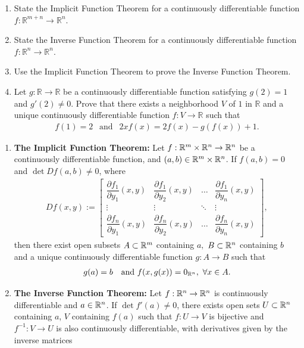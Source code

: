 \begin{problem}
\begin{enumerate}
    \item[(a)] State the Implicit Function Theorem for a continuously differentiable function $f:\mathbb{R}^{m+n} \rightarrow \mathbb{R}^{n}$.
    \item[(b)] State the Inverse Function Theorem for a continuously differentiable function $f:\mathbb{R}^n \rightarrow \mathbb{R}^n$.
    \item[(c)] Use the Implicit Function Theorem to prove the Inverse Function Theorem. 
    \item[(d)] Let $g:\mathbb{R}\rightarrow\mathbb{R}$ be a continuously differentiable function satisfying $g(2)=1$ and $g'(2)\neq 0$. Prove that there exists a neighborhood $V$ of $1$ in $\mathbb{R}$ and a unique continuously differentiable function $f:V\rightarrow \mathbb{R}$ such that 
    \begin{align*}
        f(1)=2\ \  \text{ and }\ \  2xf(x) = 2f(x) - g(f(x)) +1.
    \end{align*}
\end{enumerate}
\begin{solution}
\begin{enumerate}
    \item[(a)] \textbf{The Implicit Function Theorem:} Let $f: \mathbb{R}^{m}\times\mathbb{R}^n \to \mathbb{R}^n$ be a continuously differentiable function, and $(a,b)\in \mathbb{R}^m \times \mathbb{R}^n$. If $f(a,b) = 0$ and $\det Df(a,b) \ne 0$, where 
    \begin{align*}
        Df(x,y) := 
        \begin{bmatrix}
            \dfrac{\partial f_1}{\partial y_1}(x,y) & \dfrac{\partial f_1}{\partial y_2}(x,y) & \dots & \dfrac{\partial f_1}{\partial y_n}(x,y) \\
            \vdots & \vdots & \ddots & \vdots \\
            \dfrac{\partial f_n}{\partial y_1}(x,y) & \dfrac{\partial f_n}{\partial y_2}(x,y) & \dots & \dfrac{\partial f_n}{\partial y_n}(x,y) 
         \end{bmatrix},
    \end{align*}
    then there exist open subsets $A \subset \mathbb{R}^m$ containing $a,$ $B\subset \mathbb{R}^n$ containing $b$ and a unique continuously differentiable function $g:A\rightarrow B$ such that 
    \begin{align*}
        g(a) = b \ \ \text{ and } f(x,g(x)) = 0_{\mathbb{R}^n},\ \forall x\in A.
    \end{align*}
    \item[(b)] \textbf{The Inverse Function Theorem:} Let $f: \mathbb{R}^n \to \mathbb{R}^n$ is continuously differentiable and $a\in \mathbb{R}^n$. If $\det f'(a) \ne 0$, there exists open sets $U \subset \mathbb{R}^n$ containing $a$, $V$ containing $f(a)$ such that $f: U \to V$ is bijective and $f^{-1}: V \to U$ is also continuously differentiable, with derivatives given by the inverse matrices

\end{enumerate}
\end{solution}
\end{problem}
